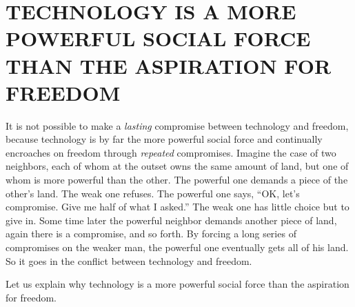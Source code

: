 \chapter{TECHNOLOGY IS A MORE POWERFUL SOCIAL FORCE THAN THE ASPIRATION FOR FREEDOM}

 It is not possible to make a {\em lasting} compromise between technology and freedom, because technology is by far the more powerful social force and continually encroaches on freedom through {\em repeated} compromises. Imagine the case of two neighbors, each of whom at the outset owns the same amount of land, but one of whom is more powerful than the other. The powerful one demands a piece of the other’s land. The weak one refuses. The powerful one says, “OK, let’s compromise. Give me half of what I asked.” The weak one has little choice but to give in. Some time later the powerful neighbor demands another piece of land, again there is a compromise, and so forth. By forcing a long series of compromises on the weaker man, the powerful one eventually gets all of his land. So it goes in the conflict between technology and freedom.

 Let us explain why technology is a more powerful social force than the aspiration for freedom.

